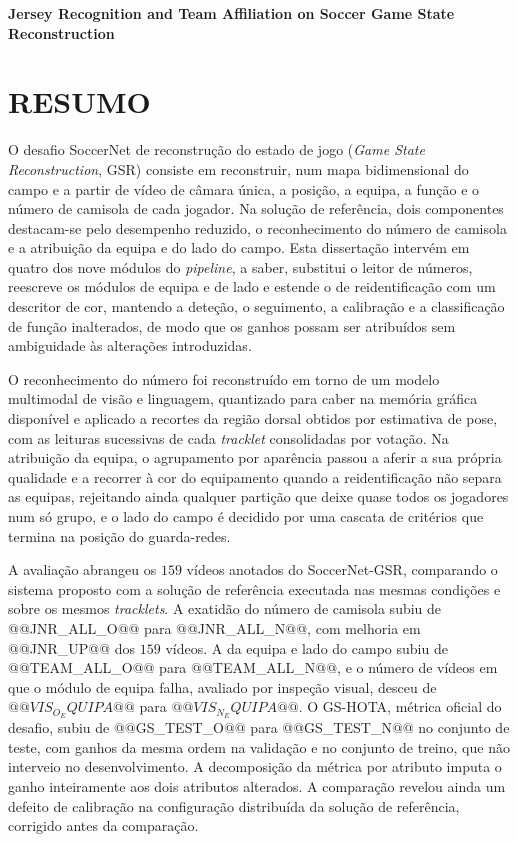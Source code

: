 \begingroup
\begin{flushleft}
\bfseries
{}
{\Large
Jersey Recognition and Team Affiliation on Soccer Game State Reconstruction}

\mdseries
\end{flushleft}
\normalsize
\let\clearpage\relax
\chapter{RESUMO}
\endgroup

\noindent O desafio SoccerNet de reconstrução do estado de jogo (\emph{Game State Reconstruction},
GSR) consiste em reconstruir, num mapa bidimensional do campo e a partir de vídeo de câmara única,
a posição, a equipa, a função e o número de camisola de cada jogador. Na solução de referência, dois
componentes destacam-se pelo desempenho reduzido, o reconhecimento do número de camisola e a
atribuição da equipa e do lado do campo. Esta dissertação intervém em quatro dos nove módulos do
\emph{pipeline}, a saber, substitui o leitor de números, reescreve os módulos de equipa e de lado e estende
o de reidentificação com um descritor de cor, mantendo a deteção, o seguimento, a calibração e a
classificação de função inalterados, de modo que os ganhos possam ser atribuídos sem ambiguidade às
alterações introduzidas.

O reconhecimento do número foi reconstruído em torno de um modelo multimodal de visão e linguagem,
quantizado para caber na memória gráfica disponível e aplicado a recortes da região dorsal obtidos
por estimativa de pose, com as leituras sucessivas de cada \emph{tracklet} consolidadas por votação.
Na atribuição da equipa, o agrupamento por aparência passou a aferir a sua própria qualidade e a
recorrer à cor do equipamento quando a reidentificação não separa as equipas, rejeitando ainda
qualquer partição que deixe quase todos os jogadores num só grupo, e o lado do campo é decidido por
uma cascata de critérios que termina na posição do guarda-redes.

A avaliação abrangeu os $159$ vídeos anotados do SoccerNet-GSR, comparando o sistema proposto com a
solução de referência executada nas mesmas condições e sobre os mesmos \emph{tracklets}. A exatidão
do número de camisola subiu de @@JNR_ALL_O@@ para @@JNR_ALL_N@@, com melhoria em @@JNR_UP@@ dos
$159$ vídeos. A da equipa e lado do campo subiu de @@TEAM_ALL_O@@ para @@TEAM_ALL_N@@, e o número de
vídeos em que o módulo de equipa falha, avaliado por inspeção visual, desceu de $@@VIS_O_EQUIPA@@$
para $@@VIS_N_EQUIPA@@$. O GS-HOTA, métrica oficial do desafio, subiu de @@GS_TEST_O@@ para
@@GS_TEST_N@@ no conjunto de teste, com ganhos da mesma ordem na validação e no conjunto de treino,
que não interveio no desenvolvimento. A decomposição da métrica por atributo imputa o ganho
inteiramente aos dois atributos alterados. A comparação revelou ainda um defeito de calibração na
configuração distribuída da solução de referência, corrigido antes da comparação.

